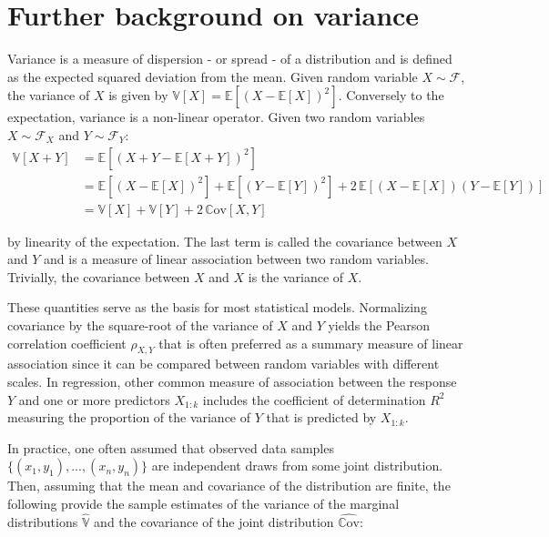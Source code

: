 \section{Further background on variance}

Variance is a measure of dispersion - or spread - of a distribution and is defined as the expected squared deviation from the mean. Given random variable $X \sim \mathcal{F}$, the variance of $X$ is given by $\mathbb{V}[X] = \mathbb{E}\left[ (X-\mathbb{E}[X])^2 \right]$. Conversely to the expectation, variance is a non-linear operator. Given two random variables $X \sim \mathcal{F}_X$ and $Y \sim \mathcal{F}_Y$: 
\begin{equation}
\begin{aligned}
\mathbb{V}[X+Y] & = \mathbb{E}\left[ (X+Y - \mathbb{E}[X+Y])^2\right] \\
& = \mathbb{E} \left[ (X - \mathbb{E}[X])^2\right] + \mathbb{E} \left[ (Y - \mathbb{E}[Y])^2\right] + 2 \, \mathbb{E}\left[ (X - \mathbb{E}[X])(Y-\mathbb{E}[Y]) \right] \\
& = \mathbb{V}[X] + \mathbb{V}[Y] + 2 \, \mathbb{C}\text{ov}[X,Y]
\end{aligned}
\end{equation}

by linearity of the expectation. The last term is called the covariance between $X$ and $Y$ and is a measure of linear association between two random variables. Trivially, the covariance between $X$ and $X$ is the variance of $X$.

These quantities serve as the basis for most statistical models. Normalizing covariance by the square-root of the variance of $X$ and $Y$ yields the Pearson correlation coefficient $\rho_{X,Y}$ that is often preferred as a summary measure of linear association since it can be compared between random variables with different scales. In regression, other common measure of association between the response $Y$ and one or more predictors $X_{1:k}$ includes the coefficient of determination $R^2$ measuring the proportion of the variance of $Y$ that is predicted by $X_{1:k}$.

In practice, one often assumed that observed data samples $\{(x_{1},y_{1}),...,(x_n,y_n)\}$ are independent draws from some joint distribution. Then, assuming that the mean and covariance of the distribution are finite, the following provide the sample estimates of the variance of the marginal distributions $\hat{\mathbb{V}}$ and the covariance of the joint distribution $\hat{\mathbb{C}\text{ov}}$:

